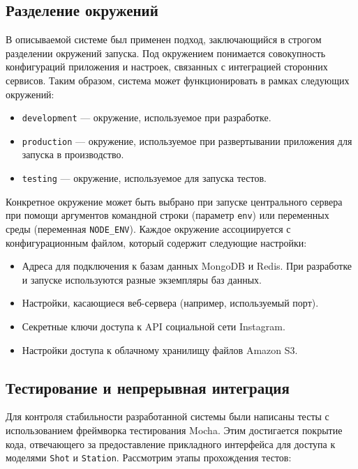 \documentclass[a4paper,14pt,href,draft]{article}
\begin{document}

\subsection{Разделение окружений}
В описываемой системе был применен подход, заключающийся в строгом разделении окружений запуска. Под окружением понимается
совокупность конфигураций приложения и настроек, связанных с интеграцией сторонних сервисов. Таким образом, система может
функционировать в рамках следующих окружений:
\begin{itemize}
  \item \texttt{development} --- окружение, используемое при разработке.
  \item \texttt{production} --- окружение, используемое при развертывании приложения для запуска в производство.
  \item \texttt{testing} --- окружение, используемое для запуска тестов.
\end{itemize}

Конкретное окружение может быть выбрано при запуске центрального сервера при помощи аргументов командной строки (параметр
\texttt{env}) или переменных среды (переменная \texttt{NODE\_ENV}). Каждое окружение ассоциируется с конфигурационным файлом,
который содержит следующие настройки:
\begin{itemize}
  \item Адреса для подключения к базам данных MongoDB и Redis. При разработке и запуске используются разные экземпляры
    баз данных.
  \item Настройки, касающиеся веб-сервера (например, используемый порт).
  \item Секретные ключи доступа к API социальной сети Instagram.
  \item Настройки доступа к облачному хранилищу файлов Amazon S3.
\end{itemize}

\subsection{Тестирование и непрерывная интеграция}
Для контроля стабильности разработанной системы были написаны тесты с использованием фреймворка тестирования Mocha. Этим
достигается покрытие кода, отвечающего за предоставление прикладного интерфейса для доступа к моделями \texttt{Shot}  и
\texttt{Station}. Рассмотрим этапы прохождения тестов:
\end{document}
